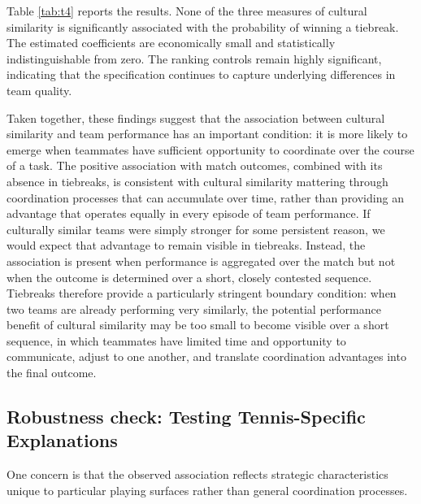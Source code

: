 \documentclass[10pt]{article}
\begin{document}
Table \ref{tab:t4} reports the results. None of the three measures of cultural similarity is significantly associated with the probability of winning a tiebreak. The estimated coefficients are economically small and statistically indistinguishable from zero.  The ranking controls remain highly significant, indicating that the specification continues to capture underlying differences in team quality.


Taken together, these findings suggest that the association between cultural similarity and team performance has an important condition: it is more likely to emerge when teammates have sufficient opportunity to coordinate over the course of a task. The positive association with match outcomes, combined with its absence in tiebreaks, is consistent with cultural similarity mattering through coordination processes that can accumulate over time, rather than providing an advantage that operates equally in every episode of team performance. If culturally similar teams were simply stronger for some persistent reason, we would expect that advantage to remain visible in tiebreaks. Instead, the association is present when performance is aggregated over the match but not when the outcome is determined over a short, closely contested sequence. Tiebreaks therefore provide a particularly stringent boundary condition: when two teams are already performing very similarly, the potential performance benefit of cultural similarity may be too small to become visible over a short sequence, in which teammates have limited time and opportunity to communicate, adjust to one another, and translate coordination advantages into the final outcome.


\subsection{Robustness check: Testing Tennis-Specific Explanations} 


One concern is that the observed association reflects strategic characteristics unique to particular playing surfaces rather than general coordination processes.  
\end{document}
